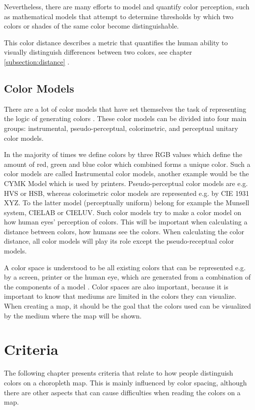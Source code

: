 Nevertheless, there are many efforts to model and quantify color perception, such as mathematical models that attempt to determine thresholds by which two colors or shades of the same color become distinguishable. 

This color distance describes a metric that quantifies the human ability to visually distinguish differences between two colors, see chapter \ref{subsection:distance} \parencite{coltekin2017}.

\subsection{Color Models}
There are a lot of color models that have set themselves the task of representing the logic of generating colors \parencite{kuehni2001}. These color models can be divided into four main groups: instrumental, pseudo-perceptual, colorimetric, and perceptual unitary color models.

In the majority of times we define colors by three RGB values which define the amount of red, green and blue color which combined forms a unique color. Such a color models are called Instrumental color models, another example would be the CYMK Model which is used by printers.
Pseudo-perceptual color models are e.g. HVS or HSB, whereas colorimetric color models are represented e.g. by CIE 1931 XYZ.
To the latter model (perceptually uniform) belong for example the Munsell system, CIELAB or CIELUV. Such color models try to make a color model on how human eyes' perception of  colors. This will be important when calculating a distance between colors, how humans see the colors. When calculating the color distance, all color models will play its role except the pseudo-receptual color models. 

A color space is understood to be all existing colors that can be represented e.g. by a screen, printer or the human eye, which are generated from a combination of the components of a model \parencite{munsell1915}. Color spaces are also important, because it is important to know that mediums are limited in the colors they can visualize. When creating a map, it should be the goal that the colors used can be visualized by the medium where the map will be shown.  

\section{Criteria}
The following chapter presents criteria that relate to how people distinguish colors on a choropleth map. This is mainly influenced by color spacing, although there are other aspects that can cause difficulties when reading the colors on a map.

